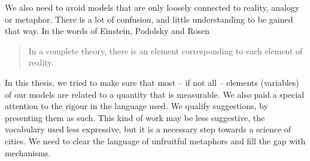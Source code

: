 We also need to avoid models that are only loosely connected to reality, analogy
or metaphor. There is a lot of confusion, and little understanding to be gained
that way. In the words of Einstein, Podolsky and Rosen

\begin{quote}
    In a complete theory, there is an element corresponding to each element of
    reality.~\cite{Einstein:1935}
\end{quote}

In this thesis, we tried to make sure that most -- if not all -- elements
(variables) of our models are related to a quantity that is measurable. We also
paid a special attention to the rigour in the language used. We qualify
suggestions, by presenting them as such.  This kind of work may be less
suggestive, the vocabulary used less expressive, but it is a necessary step
towards a science of cities. We need to clear the language of unfruitful
metaphors and fill the gap with mechanisms.


